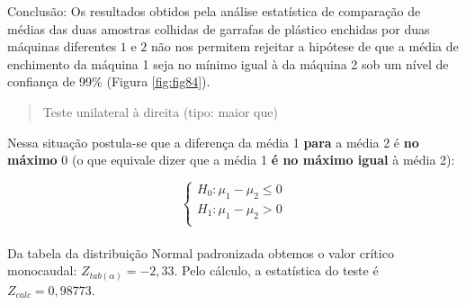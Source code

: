 \documentclass[
]{book}
\begin{document}
\hfill\break

Conclusão: Os resultados obtidos pela análise estatística de comparação de médias das duas amostras colhidas de garrafas de plástico enchidas por duas máquinas diferentes \(1\) e \(2\) não nos permitem rejeitar a hipótese de que a média de enchimento da máquina 1 seja no mínimo igual à da máquina 2 sob um nível de confiança de 99\% (Figura \ref{fig:fig84}).

\hfill\break

\begin{quote}
Teste unilateral à direita (tipo: maior que)
\end{quote}

Nessa situação postula-se que a diferença da média 1 \textbf{para} a média 2 é \textbf{no máximo} 0 (o que equivale dizer que a média 1 \textbf{é no máximo igual} à média 2):

\hfill\break

\[
\begin{cases}
    H_{0}: \mu_{1} - \mu_{2} \le 0 \\
    H_{1}: \mu_{1} - \mu_{2} >  0 \\
\end{cases}
\]\\

Da tabela da distribuição Normal padronizada obtemos o valor crítico monocaudal: \({Z}_{tab\left(\alpha \right)}=-2,33\). Pelo cálculo, a estatística do teste é \(Z_{calc}=0,98773\).

\hfill\break
\end{document}
